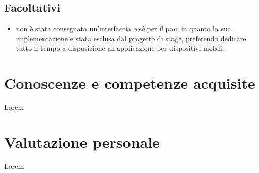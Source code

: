 \subsection{Facoltativi}

\begin{itemize}
	\item non è stata consegnata un'interfaccia \textit{web} per il \gls{poc}, in quanto la sua implementazione è stata esclusa dal progetto di stage, preferendo dedicare tutto il tempo a disposizione all'applicazione per dispositivi mobili.
\end{itemize} 

\section{Conoscenze e competenze acquisite}

Lorem

\section{Valutazione personale}

Lorem
